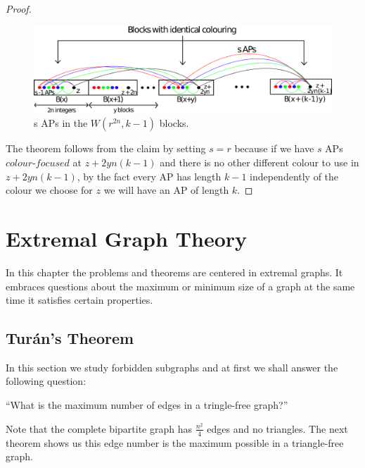 \documentclass[12pt,twoside,a4paper,bibliography=totocnumbered]{book}
\numberwithin{equation}{section}
\theoremstyle{remark}
\begin{document}
\begin{proof}
\begin{figure}[H]
     \centering
     \includegraphics[scale=0.38]{Figuras/Van-der-Waerden-Blocks.png}
     \caption{s APs in the $W(r^{2n},k-1)$ blocks.}
     \label{fig:VanderWaerdenBlocks}
\end{figure}

The theorem follows from the claim by setting $s=r$ because if we have $s$  APs $\textit{colour-focused}$ at $z+2yn(k-1)$ and there is no other different colour to use in $z+2yn(k-1)$, by the fact every AP has length $k-1$  independently of the colour we choose for $z$ we will have an AP of length $k$.
\end{proof}



\chapter{Extremal Graph Theory}
In this chapter the problems and theorems are centered in extremal graphs. It embraces questions about the maximum or minimum size of a graph at the same time it satisfies certain properties.

\section{Turán's Theorem}
In this section we study forbidden subgraphs and at first we shall answer the following 
question: 
\begin{center}``What is the maximum number of edges in a tringle-free graph?''\end{center}

Note that the complete bipartite graph has $\frac{n^{2}}{4}$ edges and no triangles. The next theorem shows us this edge number is the maximum possible in a triangle-free graph.\\
\end{document}
